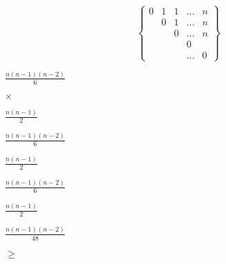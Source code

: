 \documentclass[10pt]{book}
\begin{document}
\begin{mdSnippets}
\begin{mdDisplaySnippet}%
\[ \left\{
 \begin{matrix}
   0 & 1 & 1 & ... & n\\
     & 0 & 1 & ... & n\\
     &   & 0 & ... & n\\
     &   &   & 0 \\
     &   &   & ... & 0
  \end{matrix}
  \right\}
\]%
\end{mdDisplaySnippet}%
\begin{mdInlineSnippet}[8ecdb55862c94069c997df745228a217]%
$\frac {n( n - 1 )( n - 2 )}{6}$\end{mdInlineSnippet}%
\begin{mdInlineSnippet}[60c13e05d3ec8c10b8564eae7023d9db]%
$\times$\end{mdInlineSnippet}%
\begin{mdInlineSnippet}%
$\frac{n(n-1)}{2}$\end{mdInlineSnippet}%
\begin{mdInlineSnippet}[8ecdb55862c94069c997df745228a217]%
$\frac {n( n - 1 )( n - 2 )}{6}$\end{mdInlineSnippet}%
\begin{mdInlineSnippet}%
$\frac{n(n-1)}{2}$\end{mdInlineSnippet}%
\begin{mdInlineSnippet}[8ecdb55862c94069c997df745228a217]%
$\frac {n( n - 1 )( n - 2 )}{6}$\end{mdInlineSnippet}%
\begin{mdInlineSnippet}%
$\frac{n(n-1)}{2}$\end{mdInlineSnippet}%
\begin{mdInlineSnippet}[f9d27f76c022611181620b242288ec33]%
$\frac{n( n - 1 )( n - 2) }{48}$\end{mdInlineSnippet}%
\begin{mdInlineSnippet}%
$\geq$\end{mdInlineSnippet}%
\begin{mdInlineSnippet}%

\end{mdInlineSnippet}
\end{mdSnippets}
\end{document}
